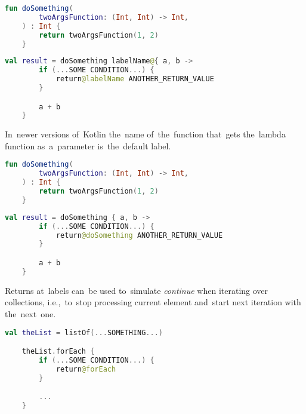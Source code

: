 \begin{lstlisting}[language=Kotlin, title={Function taking other function as the~only parameter}]
    fun doSomething(
        twoArgsFunction: (Int, Int) -> Int,
    ) : Int {
        return twoArgsFunction(1, 2)
    }
\end{lstlisting}
\begin{lstlisting}[language=Kotlin, title={Usage}]
    val result = doSomething labelName@{ a, b ->
        if (...SOME CONDITION...) {
            return@labelName ANOTHER_RETURN_VALUE
        }

        a + b
    }
\end{lstlisting}
\newline

\noindent In~newer versions of~Kotlin the~name of~the~function that~gets the~lambda function as~a~parameter is~the~default label.
\newpage

\begin{lstlisting}[language=Kotlin, title={Function taking other function as the~only parameter}]
    fun doSomething(
        twoArgsFunction: (Int, Int) -> Int,
    ) : Int {
        return twoArgsFunction(1, 2)
    }
\end{lstlisting}
\newline

\begin{lstlisting}[language=Kotlin, title={Usage}]
    val result = doSomething { a, b ->
        if (...SOME CONDITION...) {
            return@doSomething ANOTHER_RETURN_VALUE
        }

        a + b
    }
\end{lstlisting}
\newline
\newline

\noindent Returns at~labels can~be used to~simulate \textit{continue} when iterating over collections, i.e.,~to~stop processing current element and~start next iteration with the~next~one.
\newline

\begin{lstlisting}[language=Kotlin]
    val theList = listOf(...SOMETHING...)

    theList.forEach {
        if (...SOME CONDITION...) {
            return@forEach
        }

        ...
    }
\end{lstlisting}
\newline

